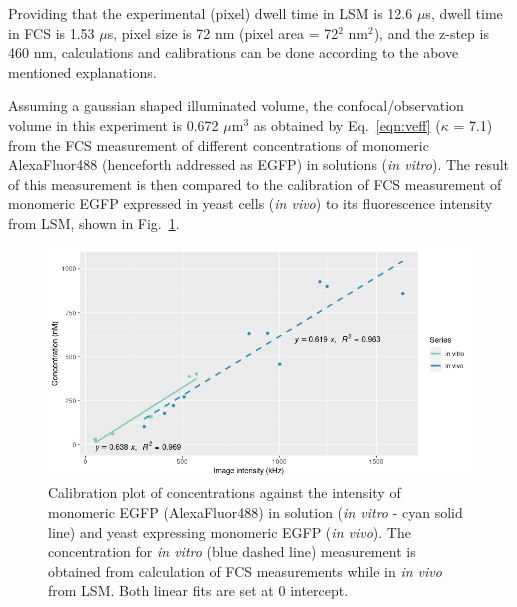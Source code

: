 Providing that the experimental (pixel) dwell time in LSM is 12.6 $\mu$s, dwell time in FCS is 1.53 $\mu$s, pixel size is 72 nm (pixel area = 72$^{2}$ nm$^{2}$), and the z-step is 460 nm, calculations and calibrations can be done according to the above mentioned explanations.

Assuming a gaussian shaped illuminated volume, the confocal/observation volume in this experiment is 0.672 $\mu$m$^{3}$ as obtained by Eq.~\ref{eqn:veff} ($\kappa$ = 7.1) from the FCS measurement of different concentrations of monomeric AlexaFluor488 (henceforth addressed as EGFP) in solutions (\textit{in vitro}). 
The result of this measurement is then compared to the calibration of FCS measurement of monomeric EGFP expressed in yeast cells (\textit{in vivo}) to its fluorescence intensity from LSM, shown in Fig.~\ref{fig:monogfp}.  


\begin{figure}[!h]
\centering
\includegraphics[width=0.9\columnwidth]{Exp_9_FCS/Figures/Calplot}
\caption{Calibration plot of concentrations against the intensity of monomeric EGFP (AlexaFluor488) in solution (\textit{in vitro} - cyan solid line) and yeast expressing monomeric EGFP (\textit{in vivo}). The concentration for \textit{in vitro} (blue dashed line) measurement is obtained from calculation of FCS measurements while in \textit{in vivo} from LSM. 
Both linear fits are set at 0 intercept.}
\label{fig:monogfp}
\end{figure}

